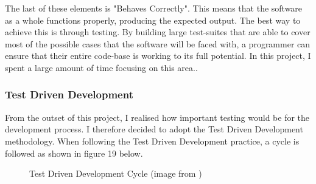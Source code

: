 The last of these elements is "Behaves Correctly". This means that the software as a whole functions properly, producing the expected output. The best way to achieve this is through testing. By building large test-suites that are able to cover most of the possible cases that the software will be faced with, a programmer can ensure that their entire code-base is working to its full potential. In this project, I spent a large amount of time focusing on this area..

\subsubsection{Test Driven Development \label{TDD}}
From the outset of this project, I realised how important testing would be for the development process. I therefore decided to adopt the Test Driven Development methodology. When following the Test Driven Development practice, a cycle is followed as shown in figure 19 below.

\begin{figure}[!ht]
	\centering
	\caption{Test Driven Development Cycle (image from \cite{SED})}
\end{figure}

